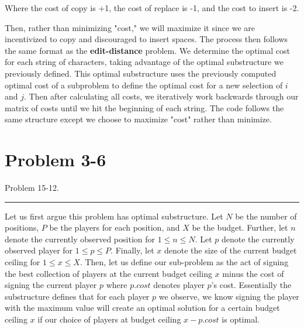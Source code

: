 \documentclass[11pt]{article}
\def\separateline{\medskip\hrule\medskip}
\begin{document}
Where the cost of copy is +1, the cost of replace is -1, and the cost to insert is -2.

Then, rather than minimizing "cost," we will maximize it since we are incentivized to copy and discouraged to insert spaces. The process then follows the same format as the \textbf{edit-distance} problem. We determine the optimal cost for each string of characters, taking advantage of the optimal substructure we previously defined. This optimal substructure uses the previously computed optimal cost of a subproblem to define the optimal cost for a new selection of $i$ and $j$. Then after calculating all costs, we iteratively work backwards through our matrix of costs until we hit the beginning of each string. The code follows the same structure except we choose to maximize "cost" rather than minimize.

\newpage

\section{Problem 3-6}
Problem 15-12.
\separateline

Let us first argue this problem has optimal substructure. Let $N$ be the number of positions, $P$ be the players for each position, and $X$ be the budget. Further, let $n$ denote the currently observed position for $1 \leq n \leq N$. Let $p$ denote the currently observed player for $1 \leq p \leq P$. Finally, let $x$ denote the size of the current budget ceiling for $1 \leq x \leq X$. Then, let us define our sub-problem as the act of signing the best collection of players at the current budget ceiling $x$ minus the cost of signing the current player $p$ where $p.cost$ denotes player $p$'s cost. Essentially the substructure defines that for each player $p$ we observe, we know signing the player with the maximum value will create an optimal solution for a certain budget ceiling $x$ if our choice of players at budget ceiling $x - p.cost$ is optimal.
\end{document}
